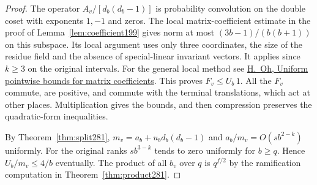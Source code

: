 \documentclass[a4paper,11pt]{article}
\theoremstyle{definition}
\theoremstyle{remark}
\numberwithin{equation}{section}
\begin{document}
\begin{proof}
The operator \(A_v/[d_b(d_b-1)]\) is probability convolution
on the double coset with exponents \(1,-1\) and zeros.
The local matrix-coefficient estimate in the proof of
Lemma~\ref{lem:coefficient199} gives norm at most
\((3b-1)/(b(b+1))\) on this subspace. Its local argument
uses only three coordinates, the size of the residue field
and the absence of special-linear invariant vectors.
It applies since \(k\ge3\) on the original intervals.
For the general local method see
\href{https://gauss.math.yale.edu/~ho2/doc/mat.pdf}
{H.~Oh, Uniform pointwise bounds for matrix coefficients}.
This proves \(F_v\le U_b\,1\). All the \(F_v\) commute,
are positive, and commute with the terminal translations,
which act at other places. Multiplication gives the bounds,
and then compression preserves the quadratic-form inequalities.

By Theorem~\ref{thm:split281},
\(m_v=a_b+u_b d_b(d_b-1)\) and \(a_b/m_v=O(s b^{2-k})\)
uniformly. For the original ranks \(s b^{3-k}\) tends to
zero uniformly for \(b\ge q\). Hence \(U_b/m_v\le4/b\)
eventually. The product of all \(b_v\) over \(q\) is
\(q^{f/2}\) by the ramification computation in
Theorem~\ref{thm:product281}.
\end{proof}
\end{document}
